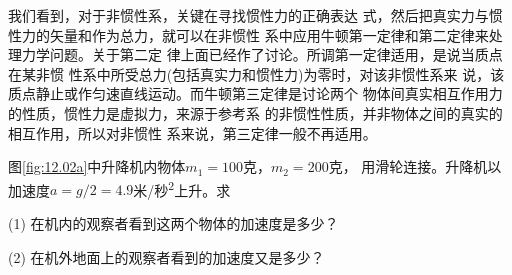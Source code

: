 我们看到，对于非惯性系，关键在寻找惯性力的正确表达
式，然后把真实力与惯性力的矢量和作为总力，就可以在非惯性
系中应用牛顿第一定律和第二定律来处理力学问题。关于第二定
律上面已经作了讨论。所调第一定律适用，是说当质点在某非惯
性系中所受总力(包括真实力和惯性力)为零时，对该非惯性系来
说，该质点静止或作匀速直线运动。而牛顿第三定律是讨论两个
物体间真实相互作用力的性质，惯性力是虚拟力，来源于参考系
的非惯性性质，并非物体之间的真实的相互作用，所以对非惯性
系来说，第三定律一般不再适用。

\begin{figure}[h]
    \vspace{1em}
    \centering
    \caption{}
    \label{fig:12.02}
    \vspace{0.5em}
\end{figure}

\example 图\ref{fig:12.02a}中升降机内物体$  m _ { 1 } = 1 0 0   $克，$  m _ { 2 } = 2 0 0   $克，
用滑轮连接。升降机以加速度$ a = g / 2 = 4 . 9 $米/秒\textsuperscript{2}上升。求

(1) 在机内的观察者看到这两个物体的加速度是多少？

(2) 在机外地面上的观察者看到的加速度又是多少？

